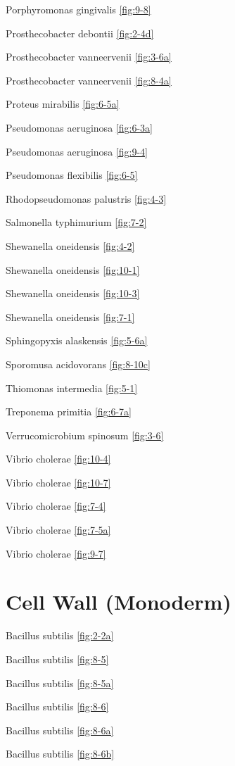 \documentclass[]{tufte-book}
\begin{document}
Porphyromonas gingivalis \ref{fig:9-8}

Prosthecobacter debontii \ref{fig:2-4d}

Prosthecobacter vanneervenii \ref{fig:3-6a}

Prosthecobacter vanneervenii \ref{fig:8-4a}

Proteus mirabilis \ref{fig:6-5a}

Pseudomonas aeruginosa \ref{fig:6-3a}

Pseudomonas aeruginosa \ref{fig:9-4}

Pseudomonas flexibilis \ref{fig:6-5}

Rhodopseudomonas palustris \ref{fig:4-3}

Salmonella typhimurium \ref{fig:7-2}

Shewanella oneidensis \ref{fig:4-2}

Shewanella oneidensis \ref{fig:10-1}

Shewanella oneidensis \ref{fig:10-3}

Shewanella oneidensis \ref{fig:7-1}

Sphingopyxis alaskensis \ref{fig:5-6a}

Sporomusa acidovorans \ref{fig:8-10c}

Thiomonas intermedia \ref{fig:5-1}

Treponema primitia \ref{fig:6-7a}

Verrucomicrobium spinosum \ref{fig:3-6}

Vibrio cholerae \ref{fig:10-4}

Vibrio cholerae \ref{fig:10-7}

Vibrio cholerae \ref{fig:7-4}

Vibrio cholerae \ref{fig:7-5a}

Vibrio cholerae \ref{fig:9-7}

\hypertarget{cell-wall-monoderm}{%
\section*{Cell Wall (Monoderm)}\label{cell-wall-monoderm}}

Bacillus subtilis \ref{fig:2-2a}

Bacillus subtilis \ref{fig:8-5}

Bacillus subtilis \ref{fig:8-5a}

Bacillus subtilis \ref{fig:8-6}

Bacillus subtilis \ref{fig:8-6a}

Bacillus subtilis \ref{fig:8-6b}
\end{document}
